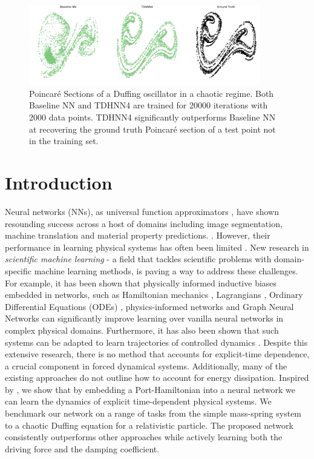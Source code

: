 \documentclass[twoside]{article}
\begin{document}
\begin{figure}[ht!]
\centering
\includegraphics[width=0.9\textwidth]{figures/main_fig.pdf}
\caption{Poincar\'e Sections of a Duffing oscillator in a chaotic regime. Both Baseline NN and TDHNN4 are trained for 20000 iterations with 2000 data points. TDHNN4 significantly outperforms Baseline NN at recovering the ground truth Poincar\'e section of a test point not in the training set.}
\label{fig.chaos1}
\end{figure}

\section{Introduction}

Neural networks (NNs), as universal function approximators \cite{hornik_multilayer_1989}, have shown resounding success across a host of domains including image segmentation, machine translation and material property predictions. \cite{he_mask_2018,devlin_bert_2019,toussaint_differentiable_2018,yao_tensormol-01_2018}. However, their performance in learning physical systems has often been limited \cite{greydanus_hamiltonian_2019,pukrittayakamee_simultaneous_2009}. New research in \textit{scientific machine learning} - a field that tackles scientific problems with domain-specific machine learning methods, is paving a way to address these challenges. For example, it has been shown that physically informed inductive biases embedded in networks, such as Hamiltonian mechanics \cite{mattheakis_hamiltonian_2020, greydanus_hamiltonian_2019}, Lagrangians \cite{cranmer_lagrangian_2020, lutter_deep_2019}, Ordinary Differential Equations (ODEs) \cite{chen_neural_2018}, physics-informed networks \cite{raissi_physics_2017} and Graph Neural Networks \cite{battaglia_interaction_2016,sanchez-gonzalez_hamiltonian_2019} can significantly improve learning over vanilla neural networks in complex physical domains. Furthermore, it has also been shown that such systems can be adapted to learn trajectories of controlled dynamics \cite{lutter_deep_2019,zhong_dissipative_2020}. Despite this extensive research, there is no method that accounts for explicit-time dependence, a crucial component in forced dynamical systems. Additionally, many of the existing approaches do not outline how to account for energy dissipation. Inspired by \cite{zhong_dissipative_2020}, we show that by embedding a Port-Hamiltonian into a neural network we can learn the dynamics of explicit time-dependent physical systems. We benchmark our network on a range of tasks from the simple mass-spring system to a chaotic Duffing equation for a relativistic particle. The proposed network consistently outperforms other approaches while actively learning both the driving force and the damping coefficient. 
\end{document}
